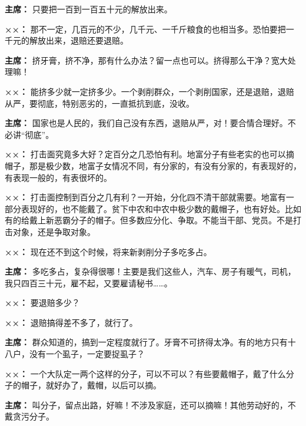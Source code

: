 \begin{duihua}
\item[\textbf{主席：}] 只要把一百到一百五十元的解放出来。

\item[\textbf{××：}] 那不一定，几百元的不少，几千元、一千斤粮食的也相当多。恐怕要把一千元的解放出来，退赔还要退赔。

\item[\textbf{主席：}] 挤牙膏，挤不净，那有什么办法？留一点也可以。挤得那么干净？宽大处理嘛！

\item[\textbf{××：}] 能挤多少就一定挤多少。一个剥削群众，一个剥削国家，还是退赔，退赔从严，要彻底，特别恶劣的，一直抵抗到底，没收。

\item[\textbf{主席：}] 国家也是人民的，我们自己没有东西，退赔从严，对！要合情合理好。不必讲“彻底”。

\item[\textbf{××：}] 打击面究竟多大好？定百分之几恐怕有利。地富分子有些老实的也可以摘帽子，那是极少数，地富子女情况不同，有分家的，有没有分家的，有表现好的，有表现一般的，有表很坏的。

\item[\textbf{××：}] 打击面控制到百分之几有利？一开始，分化四不清干部就需要。地富有一部分表现好的，也不能戴了。贫下中农和中农中极少数的戴帽子，也有好处。比如有的给戴上新恶霸分子的帽子。但多数应分化、争取。不能当干部、党员。不是打击对象，还是争取对象。

\item[\textbf{××：}] 现在还不到这个时候，将来新剥削分子多吃多占。

\item[\textbf{主席：}] 多吃多占，复杂得很哪！主要是我们这些人，汽车、房子有暖气，司机，我只四百三十元，雇不起，又要雇请秘书……。

\item[\textbf{××：}] 要退赔多少？

\item[\textbf{××：}] 退赔搞得差不多了，就行了。

\item[\textbf{主席：}] 群众知道的，搞到一定程度就行了。牙膏不可挤得太净。有的地方只有十八户，没有一个虱子，一定要捉虱子？

\item[\textbf{××：}] 一个大队定一两个这样的分子，可以不可以？有些要戴帽子，戴了什么分子的帽子，就好办了，戴帽，以后可以摘。

\item[\textbf{主席：}] 叫分子，留点出路，好嘛！不涉及家庭，还可以摘嘛！其他劳动好的，不戴贪污分子。


\end{duihua}
